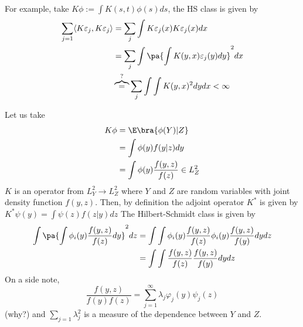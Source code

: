 \begin{example}
    For example, take $K\phi:=\int K(s,t)\phi(s)ds$, the HS class is given by \begin{equation*}
        \begin{split}
            \sum_{j=1}\langle K\varepsilon_j,K\varepsilon_j \rangle&=\sum_j \int K\varepsilon_j(x)K\varepsilon_j(x)dx\\
            &= \sum_j \int \pa{\int K(y,x)\varepsilon_j(y)dy}^2dx\\
            &\overbrace{=}^{?}\sum_j \int \int K(y,x)^2dydx < \infty
        \end{split}
    \end{equation*}
\end{example}

\begin{example}
    Let us take \begin{equation*}
        \begin{split}
            K\phi&=\E\bra{\phi(Y)|Z }\\&=\int \phi(y)f(y|z)dy \\
            &= \int \phi(y)\frac{f(y,z)}{f(z)}\in L_Z^2\\
        \end{split}
    \end{equation*} $K$ is an operator from $L_Y^2 \to L_Z^2$ where $Y$ and $Z$ are random variables with joint density function $f(y,z)$.
    Then, by definition the adjoint operator $K^*$ is given by $K^*\psi(y)=\int \psi(z)f(z|y)dz$
    The Hilbert-Schmidt class is given by \begin{equation*}
        \begin{split}
            \int \pa{\int \phi_i(y)\frac{f(y,z)}{f(z)}dy}^2dz&= \int \int \phi_i(y)\frac{f(y,z)}{f(z)}\phi_i(y)\frac{f(y,z)}{f(y)}dy dz\\&= \int \int \frac{f(y,z)}{f(z)}\frac{f(y,z)}{f(y)}dy dz
        \end{split}
    \end{equation*}
    On a side note, $$\frac{f(y,z)}{f(y)f(z)}=\sum_{j=1}^{\infty} \lambda_j \varphi_j(y)\psi_j(z)$$ {\color{red} (why?)} and $\sum_{j=1}\lambda_j^2$ is a measure of the dependence between $Y$ and $Z$.
\end{example}

